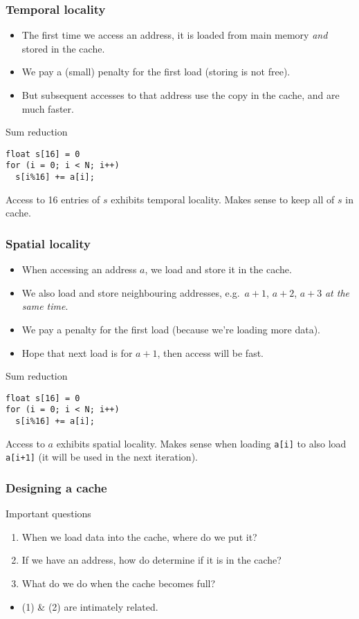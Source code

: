 \documentclass[presentation,aspectratio=43,10pt]{beamer}
\begin{document}
\begin{frame}[fragile]
  \frametitle{Temporal locality}
  \begin{itemize}
  \item The first time we access an address, it is loaded from main
    memory \emph{and} stored in the cache.
  \item We pay a (small) penalty for the first load (storing is not free).
  \item But subsequent accesses to that address use the copy in the
    cache, and are much faster.
  \end{itemize}
  \begin{exampleblock}{Sum reduction}
\begin{verbatim}
float s[16] = 0
for (i = 0; i < N; i++)
  s[i%16] += a[i];
\end{verbatim}
    Access to 16 entries of $s$ exhibits temporal locality. Makes
    sense to keep all of $s$ in cache.
  \end{exampleblock}
\end{frame}
\begin{frame}[fragile]
  \frametitle{Spatial locality}
  \begin{itemize}
  \item When accessing an address $a$, we load and store it in the
    cache.
  \item We also load and store neighbouring addresses, e.g.~$a+1$,
    $a+2$, $a+3$ \emph{at the same time}.
  \item We pay a penalty for the first load (because we're loading
    more data).
  \item Hope that next load is for $a+1$, then access will be fast.
  \end{itemize}
  \begin{exampleblock}{Sum reduction}
\begin{verbatim}
float s[16] = 0
for (i = 0; i < N; i++)
  s[i%16] += a[i];
\end{verbatim}
    Access to $a$ exhibits spatial locality. Makes sense when loading
    \texttt{a[i]} to also load \texttt{a[i+1]} (it will be used in the
    next iteration).
  \end{exampleblock}
\end{frame}

\begin{frame}
  \frametitle{Designing a cache}
  \begin{block}{Important questions}
    \begin{enumerate}
    \item When we load data into the cache, where do we put it?
    \item If we have an address, how do determine if it is in the
      cache?
    \item What do we do when the cache becomes full?
    \end{enumerate}
  \end{block}

  \begin{itemize}
  \item (1) \& (2) are intimately related.
  \end{itemize}
\end{frame}
\end{document}
